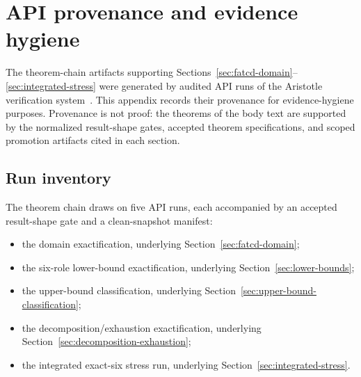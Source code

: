 \section{API provenance and evidence hygiene}\label{app:api-provenance}

%
%

The theorem-chain artifacts supporting
Sections~\ref{sec:fatcd-domain}--\ref{sec:integrated-stress} were
generated by audited API runs of the Aristotle verification
system~\citep{Achim2025Aristotle}.
This appendix records their provenance for evidence-hygiene purposes.
Provenance is not proof: the theorems of the body text are supported
by the normalized result-shape gates, accepted theorem
specifications, and scoped promotion artifacts cited in each section.

\subsection{Run inventory}\label{app:run-inventory}

The theorem chain draws on five API runs, each accompanied by an
accepted result-shape gate and a clean-snapshot manifest:

\begin{itemize}[topsep=2pt,itemsep=1pt]
  \item the \FATCD{} domain exactification, underlying
    Section~\ref{sec:fatcd-domain};
  \item the six-role lower-bound exactification, underlying
    Section~\ref{sec:lower-bounds};
  \item the upper-bound classification, underlying
    Section~\ref{sec:upper-bound-classification};
  \item the decomposition/exhaustion exactification, underlying
    Section~\ref{sec:decomposition-exhaustion};
  \item the integrated exact-six stress run, underlying
    Section~\ref{sec:integrated-stress}.
\end{itemize}

